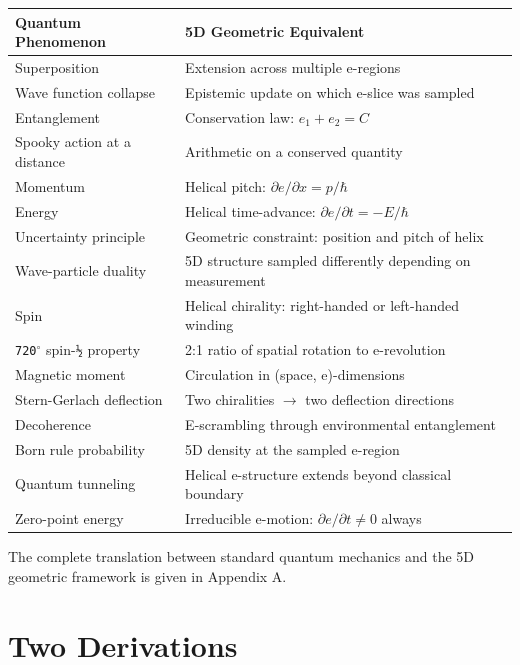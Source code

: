 \documentclass[aps,prd,preprint,superscriptaddress,longbibliography,floatfix]{revtex4-2}
\theoremstyle{remark}
\begin{document}
\begin{table}[H]
\begin{ruledtabular}
\begin{tabular}{p{7.5cm}p{7.5cm}}
Quantum Phenomenon & 5D Geometric Equivalent \\
\hline
Superposition & Extension across multiple e-regions \\
Wave function collapse & Epistemic update on which e-slice was sampled \\
Entanglement & Conservation law: $e_{1} + e_{2} = C$ \\
Spooky action at a distance & Arithmetic on a conserved quantity \\
Momentum & Helical pitch: $\partial e/\partial x = p/\hbar$ \\
Energy & Helical time-advance: $\partial e/\partial t = -E/\hbar$ \\
Uncertainty principle & Geometric constraint: position and pitch of helix \\
Wave-particle duality & 5D structure sampled differently depending on measurement \\
Spin & Helical chirality: right-handed or left-handed winding \\
\texttt{720$^{\circ}$} spin-\texttt{½} property & 2:1 ratio of spatial rotation to e-revolution \\
Magnetic moment & Circulation in (space, e)-dimensions \\
Stern-Gerlach deflection & Two chiralities $\to$ two deflection directions \\
Decoherence & E-scrambling through environmental entanglement \\
Born rule probability & 5D density at the sampled e-region \\
Quantum tunneling & Helical e-structure extends beyond classical boundary \\
Zero-point energy & Irreducible e-motion: $\partial e/\partial t \neq 0$ always \\
\end{tabular}
\end{ruledtabular}
\end{table}

The complete translation between standard quantum mechanics and the 5D geometric framework is given in Appendix A.


\section{Two Derivations}
\end{document}
